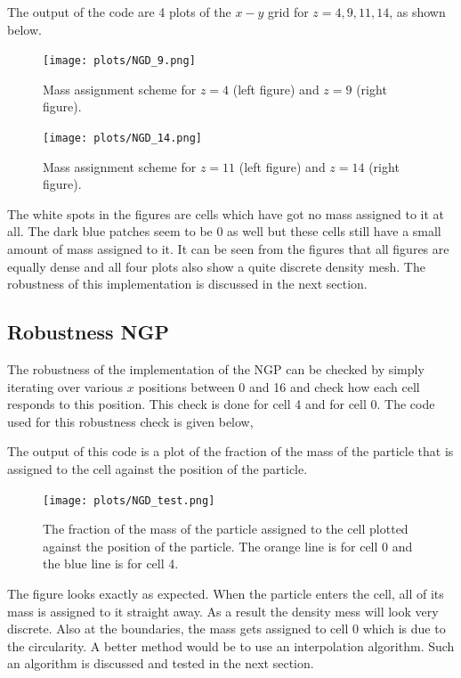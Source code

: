 
The output of the code are 4 plots of the $x-y$ grid for $z = 4,9,11,14$, as shown below.

\begin{figure}[h]
\centering
\texttt{[image: plots/NGD\_9.png]}
\caption{Mass assignment scheme for $z = 4$ (left figure) and $z = 9$ (right figure).}
\end{figure}
\begin{figure}[h]
\centering
\texttt{[image: plots/NGD\_14.png]}
\caption{Mass assignment scheme for $z = 11$ (left figure) and $z = 14$ (right figure).}
\end{figure}
The white spots in the figures are cells which have got no mass assigned to it at all. The dark blue patches seem to be 0 as well but these cells still have a small amount of mass assigned to it. It can be seen from the figures that all figures are equally dense and all four plots also show a quite discrete density mesh. The robustness of this implementation is discussed in the next section.


\subsection{Robustness NGP}

The robustness of the implementation of the NGP can be checked by simply iterating over various $x$ positions between 0 and 16 and check how each cell responds to this position. This check is done for cell 4 and for cell 0. The code used for this robustness check is given below,



The output of this code is a plot of the fraction of the mass of the particle that is assigned to the cell against the position of the particle.

\begin{figure}[h]
\centering
\texttt{[image: plots/NGD\_test.png]}
\caption{The fraction of the mass of the particle assigned to the cell plotted against the position of the particle. The orange line is for cell 0 and the blue line is for cell 4.}
\end{figure}

The figure looks exactly as expected. When the particle enters the cell, all of its mass is assigned to it straight away. As a result the density mess will look very discrete. Also at the boundaries, the mass gets assigned to cell 0 which is due to the circularity. A better method would be to use an interpolation algorithm. Such an algorithm is discussed and tested in the next section.

